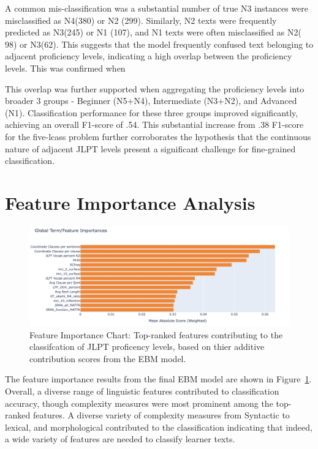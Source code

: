 A common mis-classification was a substantial number of true N3 instances were misclassified as N4(380) or N2 (299).
Similarly, N2 texts were frequently predicted as N3(245) or N1 (107), and N1 texts were often misclassified as N2(
98) or N3(62). This suggests that the model frequently confused text belonging to adjacent proficiency levels,
indicating a high overlap between the proficiency levels. This was confirmed when

This overlap was further supported when aggregating the proficiency levels into broader 3 groups - Beginner (N5+N4),
Intermediate (N3+N2), and
Advanced (N1).
Classification performance for these three groups improved significantly, achieving an overall F1-score of .54. This
substantial increase from .38 F1-score for the five-lcass problem further corroborates the hypothesis that the
continuous nature of adjacent JLPT levels present a significant challenge for fine-grained classification.

\section{Feature Importance Analysis}
\begin{figure}[h!]
    \centering
    \includegraphics[scale=.4]{img/feature_importance}
    \caption[Feature Importance Chart]{ Feature Importance Chart: Top-ranked features contributing to the classifcation of JLPT proficency levels, based on thier additive contribution scores from the EBM model.}
    \label{fig:featureimportance}
\end{figure}


The feature importance results from the final EBM model are shown in Figure~\ref{fig:featureimportance}. Overall, a
diverse range of linguistic features contributed to classification accuracy, though complexity measures were most
prominent among the top-ranked features. A diverse variety of complexity
measures from Syntactic to lexical, and morphological contributed to the classification indicating that indeed, a
wide variety of features are needed to classify learner texts.

